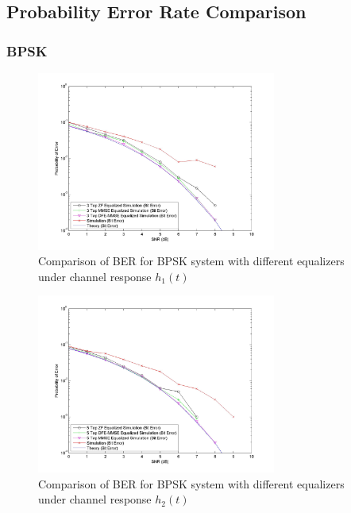\documentclass[]{article}
\begin{document}
\subsection{Probability Error Rate Comparison}
\label{sec:compare}

\subsubsection{BPSK}

\begin{figure}[H]
\centering
\includegraphics[width=0.7\textwidth]{bpSNR1.jpg}
\caption{Comparison of BER for BPSK system with different equalizers under channel response $h_1(t)$}
\end{figure}

\begin{figure}[H]
\centering
\includegraphics[width=0.7\textwidth]{bpSNR2.jpg}
\caption{Comparison of BER for BPSK system with different equalizers under channel response $h_2(t)$}
\end{figure}
\end{document}
